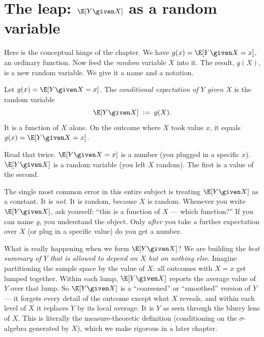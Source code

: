 \section{The leap: \texorpdfstring{$\E[Y\given X]$}{E[Y|X]} as a random variable}
\label{ch15:the-leap}

Here is the conceptual hinge of the chapter. We have $g(x) = \E[Y\given X = x]$, an ordinary function.
Now feed the \emph{random} variable $X$ into it. The result, $g(X)$, is a new random variable. We give
it a name and a notation.

\begin{definition}
\label{ch15:def-cond-exp-rv}
Let $g(x) = \E[Y \given X = x]$. The \emph{conditional expectation of $Y$ given $X$} is the random
variable
\[
  \E[Y \given X] \;:=\; g(X).
\]
It is a function of $X$ alone. On the outcome where $X$ took value $x$, it equals $g(x) = \E[Y\given X=x]$.
\end{definition}

Read that twice. $\E[Y \given X = x]$ is a number (you plugged in a specific $x$). $\E[Y\given X]$ is a
random variable (you left $X$ random). The first is a value of the second.

\begin{trapbox}
The single most common error in this entire subject is treating $\E[Y \given X]$ as a constant. It is
\emph{not}. It is random, because $X$ is random. Whenever you write $\E[Y \given X]$, ask yourself:
``this is a function of $X$ --- which function?'' If you can name $g$, you understand the object. Only
\emph{after} you take a further expectation over $X$ (or plug in a specific value) do you get a number.
\end{trapbox}

\begin{happeningbox}
What is really happening when we form $\E[Y \given X]$? We are building the \emph{best summary of $Y$
that is allowed to depend on $X$ but on nothing else}. Imagine partitioning the sample space by the
value of $X$: all outcomes with $X = x$ get lumped together. Within each lump, $\E[Y\given X]$ reports
the average value of $Y$ over that lump. So $\E[Y\given X]$ is a ``coarsened'' or ``smoothed'' version
of $Y$ --- it forgets every detail of the outcome except what $X$ reveals, and within each level of
$X$ it replaces $Y$ by its local average. It is $Y$ as seen through the blurry lens of $X$. This is
literally the measure-theoretic definition (conditioning on the $\sigma$-algebra generated by $X$),
which we make rigorous in a later chapter.
\end{happeningbox}

